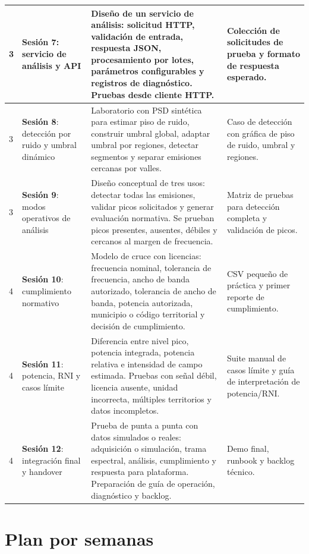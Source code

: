 \documentclass[11pt,a4paper]{article}
\newcommand{\sesion}[1]{\textbf{Sesión #1}}
\begin{document}
\begin{longtable}{|p{}|p{}|p{}|p{}|}
3 & \sesion{7}: servicio de análisis y API &
Diseño de un servicio de análisis: solicitud HTTP, validación de entrada, respuesta JSON, procesamiento por lotes, parámetros configurables y registros de diagnóstico. Pruebas desde cliente HTTP. &
Colección de solicitudes de prueba y formato de respuesta esperado. \\
\hline

3 & \sesion{8}: detección por ruido y umbral dinámico &
Laboratorio con PSD sintética para estimar piso de ruido, construir umbral global, adaptar umbral por regiones, detectar segmentos y separar emisiones cercanas por valles. &
Caso de detección con gráfica de piso de ruido, umbral y regiones. \\
\hline

3 & \sesion{9}: modos operativos de análisis &
Diseño conceptual de tres usos: detectar todas las emisiones, validar picos solicitados y generar evaluación normativa. Se prueban picos presentes, ausentes, débiles y cercanos al margen de frecuencia. &
Matriz de pruebas para detección completa y validación de picos. \\
\hline

4 & \sesion{10}: cumplimiento normativo &
Modelo de cruce con licencias: frecuencia nominal, tolerancia de frecuencia, ancho de banda autorizado, tolerancia de ancho de banda, potencia autorizada, municipio o código territorial y decisión de cumplimiento. &
CSV pequeño de práctica y primer reporte de cumplimiento. \\
\hline

4 & \sesion{11}: potencia, RNI y casos límite &
Diferencia entre nivel pico, potencia integrada, potencia relativa e intensidad de campo estimada. Pruebas con señal débil, licencia ausente, unidad incorrecta, múltiples territorios y datos incompletos. &
Suite manual de casos límite y guía de interpretación de potencia/RNI. \\
\hline

4 & \sesion{12}: integración final y handover &
Prueba de punta a punta con datos simulados o reales: adquisición o simulación, trama espectral, análisis, cumplimiento y respuesta para plataforma. Preparación de guía de operación, diagnóstico y backlog. &
Demo final, runbook y backlog técnico. \\
\hline
\end{longtable}

\section*{Plan por semanas}
\end{document}
